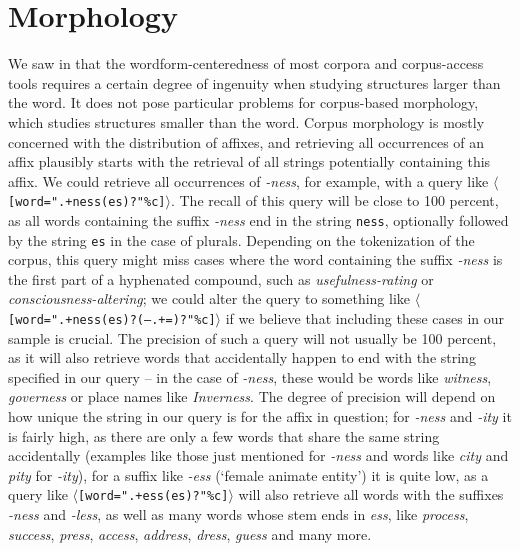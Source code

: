 \chapter{Morphology}
\label{ch:morphology}

We saw in   that the wordform\hyp{}centeredness of most corpora and corpus\hyp{}access tools requires a certain degree of ingenuity when studying structures larger than the word. It does not pose particular problems for corpus\hyp{}based morphology,  which studies structures smaller than the word. Corpus morphology is mostly concerned with the distribution  of affixes,  and retrieving  all occurrences of an affix  plausibly starts with the retrieval of all strings potentially containing this affix.  We could retrieve all occurrences of \textit{-ness}, for example, with a query like $\langle$\texttt{[word=".+ness(es)?"\%c]}$\rangle$. The recall  of this query will be close to 100 percent, as all words containing the suffix \textit{-ness} end in the string \texttt{ness}, optionally followed by the string \texttt{es} in the case of plurals.  Depending on the tokenization  of the corpus, this query might miss cases where the word containing the suffix \textit{-ness} is the first part of a hyphenated compound, such as \textit{usefulness-rating} or \textit{consciousness-altering}; we could alter the query to something like $\langle$\texttt{[word=".+ness(es)?(--.+=)?"\%c]}$\rangle$ if we believe that including these cases in our sample is crucial. The precision  of such a query will not usually be 100 percent, as it will also retrieve words that accidentally happen to end with the string specified in our query -- in the case of \textit{-ness}, these would be words like \textit{witness}, \textit{governess} or place names like \textit{Inverness}. The degree of precision will depend on how unique the string in our query is for the affix  in question; for \textit{-ness} and \textit{-ity} it is fairly high, as there are only a few words that share the same string accidentally (examples like those just mentioned for \textit{-ness} and words like \textit{city} and \textit{pity} for \textit{-ity}), for a suffix  like \textit{-ess} (`female animate entity') it is quite low, as a query like $\langle$\texttt{[word=".+ess(es)?"\%c]}$\rangle$ will also retrieve  all words with the suffixes  \textit{-ness} and \textit{-less}, as well as many words whose stem  ends in \textit{ess}, like \textit{process}, \textit{success}, \textit{press}, \textit{access}, \textit{address}, \textit{dress}, \textit{guess} and many more.

